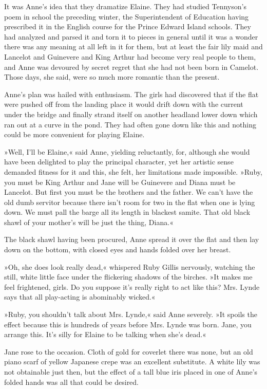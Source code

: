 It was Anne's idea that they dramatize Elaine. They had studied Tennyson's poem in school the preceding winter, the Superintendent of Education having prescribed it in the English course for the Prince Edward Island schools. They had analyzed and parsed it and torn it to pieces in general until it was a wonder there was any meaning at all left in it for them, but at least the fair lily maid and Lancelot and Guinevere and King Arthur had become very real people to them, and Anne was devoured by secret regret that she had not been born in Camelot. Those days, she said, were so much more romantic than the present.

Anne's plan was hailed with enthusiasm. The girls had discovered that if the flat were pushed off from the landing place it would drift down with the current under the bridge and finally strand itself on another headland lower down which ran out at a curve in the pond. They had often gone down like this and nothing could be more convenient for playing Elaine.

»Well, I'll be Elaine,« said Anne, yielding reluctantly, for, although she would have been delighted to play the principal character, yet her artistic sense demanded fitness for it and this, she felt, her limitations made impossible. »Ruby, you must be King Arthur and Jane will be Guinevere and Diana must be Lancelot. But first you must be the brothers and the father. We can't have the old dumb servitor because there isn't room for two in the flat when one is lying down. We must pall the barge all its length in blackest samite. That old black shawl of your mother's will be just the thing, Diana.«

The black shawl having been procured, Anne spread it over the flat and then lay down on the bottom, with closed eyes and hands folded over her breast.

»Oh, she does look really dead,« whispered Ruby Gillis nervously, watching the still, white little face under the flickering shadows of the birches. »It makes me feel frightened, girls. Do you suppose it's really right to act like this? Mrs. Lynde says that all play-acting is abominably wicked.«

»Ruby, you shouldn't talk about Mrs. Lynde,« said Anne severely. »It spoils the effect because this is hundreds of years before Mrs. Lynde was born. Jane, you arrange this. It's silly for Elaine to be talking when she's dead.«

Jane rose to the occasion. Cloth of gold for coverlet there was none, but an old piano scarf of yellow Japanese crepe was an excellent substitute. A white lily was not obtainable just then, but the effect of a tall blue iris placed in one of Anne's folded hands was all that could be desired.

